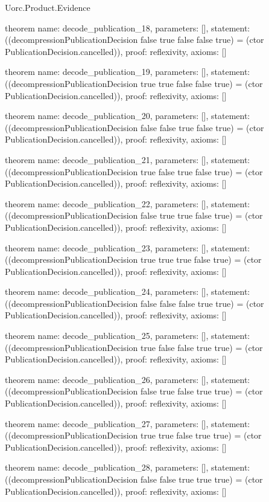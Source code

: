 \begin{lexlean}{Uorc.Product.Evidence}
\begin{semanticmodule}
theorem{
  name: decode_publication_18,
  parameters: [],
  statement: ((decompressionPublicationDecision false true false false true) = (ctor PublicationDecision.cancelled)),
  proof: reflexivity{},
  axioms: []
}

theorem{
  name: decode_publication_19,
  parameters: [],
  statement: ((decompressionPublicationDecision true true false false true) = (ctor PublicationDecision.cancelled)),
  proof: reflexivity{},
  axioms: []
}

theorem{
  name: decode_publication_20,
  parameters: [],
  statement: ((decompressionPublicationDecision false false true false true) = (ctor PublicationDecision.cancelled)),
  proof: reflexivity{},
  axioms: []
}

theorem{
  name: decode_publication_21,
  parameters: [],
  statement: ((decompressionPublicationDecision true false true false true) = (ctor PublicationDecision.cancelled)),
  proof: reflexivity{},
  axioms: []
}

theorem{
  name: decode_publication_22,
  parameters: [],
  statement: ((decompressionPublicationDecision false true true false true) = (ctor PublicationDecision.cancelled)),
  proof: reflexivity{},
  axioms: []
}

theorem{
  name: decode_publication_23,
  parameters: [],
  statement: ((decompressionPublicationDecision true true true false true) = (ctor PublicationDecision.cancelled)),
  proof: reflexivity{},
  axioms: []
}

theorem{
  name: decode_publication_24,
  parameters: [],
  statement: ((decompressionPublicationDecision false false false true true) = (ctor PublicationDecision.cancelled)),
  proof: reflexivity{},
  axioms: []
}

theorem{
  name: decode_publication_25,
  parameters: [],
  statement: ((decompressionPublicationDecision true false false true true) = (ctor PublicationDecision.cancelled)),
  proof: reflexivity{},
  axioms: []
}

theorem{
  name: decode_publication_26,
  parameters: [],
  statement: ((decompressionPublicationDecision false true false true true) = (ctor PublicationDecision.cancelled)),
  proof: reflexivity{},
  axioms: []
}

theorem{
  name: decode_publication_27,
  parameters: [],
  statement: ((decompressionPublicationDecision true true false true true) = (ctor PublicationDecision.cancelled)),
  proof: reflexivity{},
  axioms: []
}

theorem{
  name: decode_publication_28,
  parameters: [],
  statement: ((decompressionPublicationDecision false false true true true) = (ctor PublicationDecision.cancelled)),
  proof: reflexivity{},
  axioms: []
}


\end{semanticmodule}
\end{lexlean}
